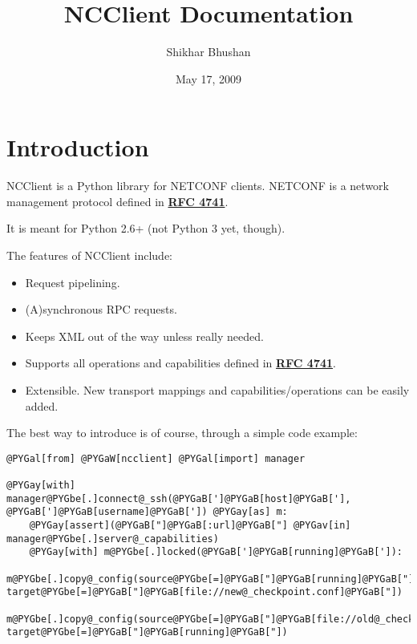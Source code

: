 \documentclass[a4paper,10pt,english]{manual}
\title{NCClient Documentation}
\date{May 17, 2009}
\author{Shikhar Bhushan}
\begin{document}
\maketitle
\tableofcontents



\resetcurrentobjects
\hypertarget{--doc-intro}{}

\chapter{Introduction}

NCClient is a Python library for NETCONF clients. NETCONF is a network management protocol defined in \href{http://tools.ietf.org/html/rfc4741.html}{\textbf{RFC 4741}}.

It is meant for Python 2.6+ (not Python 3 yet, though).

The features of NCClient include:
\begin{itemize}
\item {} 
Request pipelining.

\item {} 
(A)synchronous RPC requests.

\item {} 
Keeps XML out of the way unless really needed.

\item {} 
Supports all operations and capabilities defined in \href{http://tools.ietf.org/html/rfc4741.html}{\textbf{RFC 4741}}.

\item {} 
Extensible. New transport mappings and capabilities/operations can be easily added.

\end{itemize}

The best way to introduce is of course, through a simple code example:

\begin{Verbatim}[commandchars=@\[\]]
@PYGal[from] @PYGaW[ncclient] @PYGal[import] manager

@PYGay[with] manager@PYGbe[.]connect@_ssh(@PYGaB[']@PYGaB[host]@PYGaB['], @PYGaB[']@PYGaB[username]@PYGaB[']) @PYGay[as] m:
    @PYGay[assert](@PYGaB["]@PYGaB[:url]@PYGaB["] @PYGav[in] manager@PYGbe[.]server@_capabilities)
    @PYGay[with] m@PYGbe[.]locked(@PYGaB[']@PYGaB[running]@PYGaB[']):
        m@PYGbe[.]copy@_config(source@PYGbe[=]@PYGaB["]@PYGaB[running]@PYGaB["], target@PYGbe[=]@PYGaB["]@PYGaB[file://new@_checkpoint.conf]@PYGaB["])
        m@PYGbe[.]copy@_config(source@PYGbe[=]@PYGaB["]@PYGaB[file://old@_checkpoint.conf]@PYGaB["], target@PYGbe[=]@PYGaB["]@PYGaB[running]@PYGaB["])
\end{Verbatim}
\end{document}

